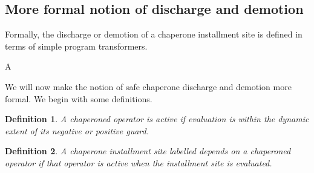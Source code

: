 \documentclass{sigplanconf}
\newtheorem{definition}{Definition}
\begin{document}
\subsection{More formal notion of discharge and demotion}

Formally, the discharge or demotion of a chaperone installment site is defined in terms of simple program transformers.

A

We will now make the notion of safe chaperone discharge and demotion more formal.
We begin with some definitions.






\begin{definition}
A chaperoned operator is \emph{active} if evaluation is within the dynamic extent of its negative or positive guard.
\end{definition}

\begin{definition}
A chaperone installment site labelled \emph{depends} on a chaperoned operator if that operator is active when the installment site is evaluated.
\end{definition}
\end{document}
